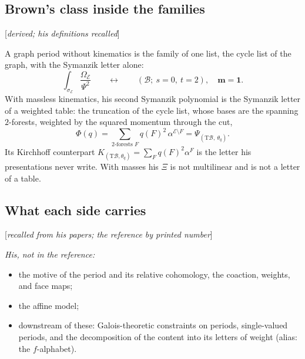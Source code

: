 \documentclass[11pt]{article}
\newcommand{\cE}{\mathcal E}
\newcommand{\cB}{\mathcal B}
\newcommand{\one}{\mathbf 1}
\newcommand{\mvec}{\mathbf m}
\newcommand{\status}[1]{\hfill{\small[\textit{#1}]}}
\theoremstyle{plain}
\theoremstyle{remark}
\begin{document}
\subsection{Brown's class inside the families}\status{derived; his definitions recalled}

A graph period without kinematics is the family of one list, the cycle list of the graph, with the Symanzik letter alone:
\[
\int_{\sigma_{\cE}}\frac{\Omega_{\cE}}{\Psi^2}\qquad\leftrightarrow\qquad(\cB;\ s=0,\ t=2),\quad \mvec=\one .
\]
With massless kinematics, his second Symanzik polynomial is the Symanzik letter of a weighted table: the truncation of the cycle list, whose bases are the spanning $2$-forests, weighted by the squared momentum through the cut,
\[
\Phi(q)=\sum_{\text{2-forests }F}q(F)^2\,\alpha^{\cE\setminus F}=\Psi_{(\mathrm T\cB,\ \theta_q)} .
\]
Its Kirchhoff counterpart $K_{(\mathrm T\cB,\theta_q)}=\sum_Fq(F)^2\alpha^F$ is the letter his presentations never write. With masses his $\Xi$ is not multilinear and is not a letter of a table.

\subsection{What each side carries}\status{recalled from his papers; the reference by printed number}

\emph{His, not in the reference:}
\begin{itemize}
\item the motive of the period and its relative cohomology, the coaction, weights, and face maps;
\item the affine model;
\item downstream of these: Galois-theoretic constraints on periods, single-valued periods, and the decomposition of the content into its letters of weight (alias: the $f$-alphabet).
\end{itemize}
\end{document}
